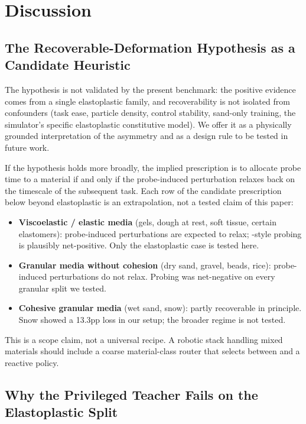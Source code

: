 \section{Discussion}
\label{sec:discussion}

\subsection{The Recoverable-Deformation Hypothesis as a Candidate Heuristic}

The hypothesis is not validated by the present benchmark: the positive evidence comes from a single elastoplastic family, and recoverability is not isolated from confounders (task ease, particle density, control stability, sand-only training, the simulator's specific elastoplastic constitutive model). We offer it as a physically grounded interpretation of the asymmetry and as a design rule to be tested in future work.

If the hypothesis holds more broadly, the implied prescription is to allocate probe time to a material if and only if the probe-induced perturbation relaxes back on the timescale of the subsequent task. Each row of the candidate prescription below beyond elastoplastic is an extrapolation, not a tested claim of this paper:
\begin{itemize}
    \item \textbf{Viscoelastic / elastic media} (gels, dough at rest, soft tissue, certain elastomers): probe-induced perturbations are expected to relax; \PTA{}-style probing is plausibly net-positive. Only the elastoplastic case is tested here.
    \item \textbf{Granular media without cohesion} (dry sand, gravel, beads, rice): probe-induced perturbations do not relax. Probing was net-negative on every granular split we tested.
    \item \textbf{Cohesive granular media} (wet sand, snow): partly recoverable in principle. Snow showed a 13.3pp loss in our setup; the broader regime is not tested.
\end{itemize}

This is a scope claim, not a universal recipe. A robotic stack handling mixed materials should include a coarse material-class router that selects between \PTA{} and a reactive policy.

\subsection{Why the Privileged Teacher Fails on the Elastoplastic Split}

